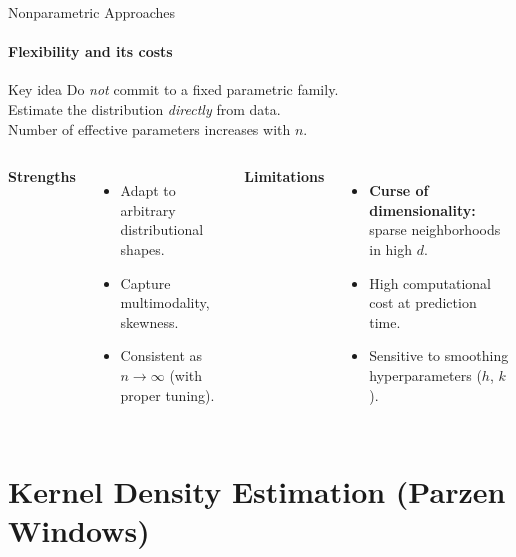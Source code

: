 \begin{frame}{Nonparametric Approaches}
  \framesubtitle{Flexibility and its costs}
  \begin{block}{Key idea}
    Do \emph{not} commit to a fixed parametric family.\\
    Estimate the distribution \emph{directly} from data.\\
    Number of effective parameters increases with $n$.
  \end{block}
  \bigskip
  \begin{columns}[T]
      \textbf{\color{tvrgreen}Strengths}
      \begin{itemize}
        \item Adapt to arbitrary distributional shapes.
        \item Capture multimodality, skewness.
        \item Consistent as $n\to\infty$ (with proper tuning).
      \end{itemize}
      \textbf{\color{tvrred}Limitations}
      \begin{itemize}
        \item \textbf{Curse of dimensionality:} sparse neighborhoods in high $d$.
        \item High computational cost at prediction time.
        \item Sensitive to smoothing hyperparameters ($h$, $k$).
      \end{itemize}
  \end{columns}
\end{frame}

\section{Kernel Density Estimation (Parzen Windows)}

